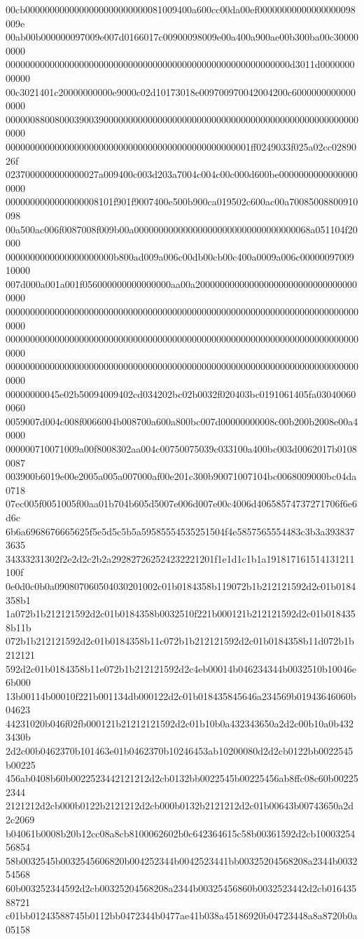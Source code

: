 00cb0000000000000000000000000081009400a600cc00da00ef00000000000000000098009e
00ab00b000000097009e007d0166017c00900098009e00a400a900ae00b300ba00c300000000
0000000000000000000000000000000000000000000000000000000000d3011d000000000000
00c3021401c20000000000e9000c02d10173018e009700970042004200c60000000000000000
0000008800800039003900000000000000000000000000000000000000000000000000000000
00000000000000000000000000000000000000000000000001ff0249033f025a02cc0289026f
0237000000000000027a009400c003d203a7004c004c00c000d600be00000000000000000000
0000000000000000008101f901f9007400e500b900ca019502c600ac00a70085008800910098
00a500ac006f0087008f009b00a000000000000000000000000000000000068a051104f20000
0000000000000000000000b800ad009a006c00db00cb00c400a0009a006c0000009700910000
007d000a001a001f056000000000000000aa00a2000000000000000000000000000000000000
0000000000000000000000000000000000000000000000000000000000000000000000000000
0000000000000000000000000000000000000000000000000000000000000000000000000000
0000000000000000000000000000000000000000000000000000000000000000000000000000
00000000045e02b50094009402cd034202bc02b0032f020403bc0191061405fa030400600060
0059007d004c008f0066004b008700a600a800bc007d00000000008c00b200b2008e00a40000
000000710071009a00f8008302aa004c00750075039c033100a400bc003d0062017b01080087
003900b6019e00e2005a005a007000af00e201c300b90071007104bc0068009000bc04da0718
07ec005f0051005f00aa01b704b605d5007e006d007e00c4006d40658574737271706f6e6d6c
6b6a6968676665625f5e5d5c5b5a59585554535251504f4e5857565554483c3b3a3938373635
34333231302f2e2d2c2b2a292827262524232221201f1e1d1c1b1a191817161514131211100f
0e0d0c0b0a090807060504030201002c01b0184358b119072b1b212121592d2c01b0184358b1
1a072b1b212121592d2c01b0184358b0032510f221b000121b212121592d2c01b0184358b11b
072b1b212121592d2c01b0184358b11c072b1b212121592d2c01b0184358b11d072b1b212121
592d2c01b0184358b11e072b1b212121592d2c4eb00014b046234344b0032510b10046e6b000
13b00114b00010f221b001134db000122d2c01b018435845646a234569b01943646060b04623
44231020b046f02fb000121b21212121592d2c01b10b0a432343650a2d2c00b10a0b4323430b
2d2c00b0462370b101463e01b0462370b10246453ab10200080d2d2cb0122bb0022545b00225
456ab0408b60b0022523442121212d2cb0132bb0022545b00225456ab8ffc08c60b002252344
2121212d2cb000b0122b2121212d2cb000b0132b2121212d2c01b00643b00743650a2d2c2069
b04061b0008b20b12cc08a8cb8100062602b0c642364615c58b00361592d2cb1000325456854
58b0032545b0032545606820b004252344b0042523441bb00325204568208a2344b003254568
60b003252344592d2cb00325204568208a2344b00325456860b0032523442d2cb01643588721
c01bb01243588745b0112bb0472344b0477ae41b038a45186920b04723448a8a8720b0a05158
